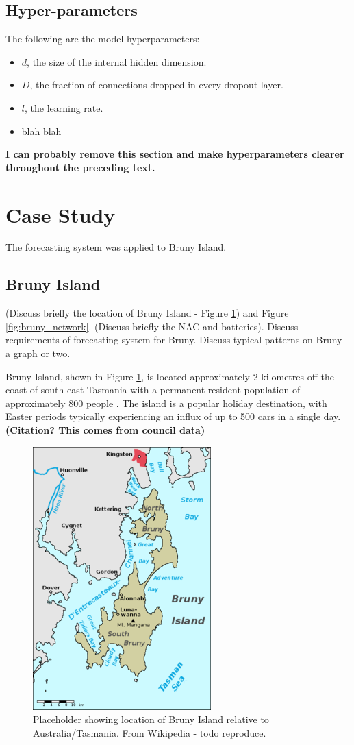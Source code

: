 \documentclass[conference]{IEEEtran}
\begin{document}
\subsection{Hyper-parameters}
The following are the model hyperparameters:
\begin{itemize}
	\item $d$, the size of the internal hidden dimension.
	\item $D$, the fraction of connections dropped in every dropout layer.
	\item $l$, the learning rate.
	\item blah blah 
\end{itemize}
\textbf{I can probably remove this section and make hyperparameters clearer throughout the preceding text.}


\section{Case Study}
The forecasting system was applied to Bruny Island.

\subsection{Bruny Island}
(Discuss briefly the location of Bruny Island - Figure \ref{fig:bruny_map}) and Figure \ref{fig:bruny_network}.
(Discuss briefly the NAC and batteries).
Discuss requirements of forecasting system for Bruny.
Discuss typical patterns on Bruny - a graph or two.

Bruny Island, shown in Figure \ref{fig:bruny_map}, is located approximately 2 kilometres off the coast of south-east Tasmania with a permanent resident population of approximately 800 people \cite{census2016}.
The island is a popular holiday destination, with Easter periods typically experiencing an influx of up to 500 cars in a single day. \textbf{(Citation? This comes from council data)}


\begin{figure}[htbp]
	\centerline{\includegraphics[width=.35\textwidth]{images/bruny_island_map.png}}
	\caption{Placeholder showing location of Bruny Island relative to Australia/Tasmania. From Wikipedia - todo reproduce.}
	\label{fig:bruny_map}
\end{figure}
\end{document}

